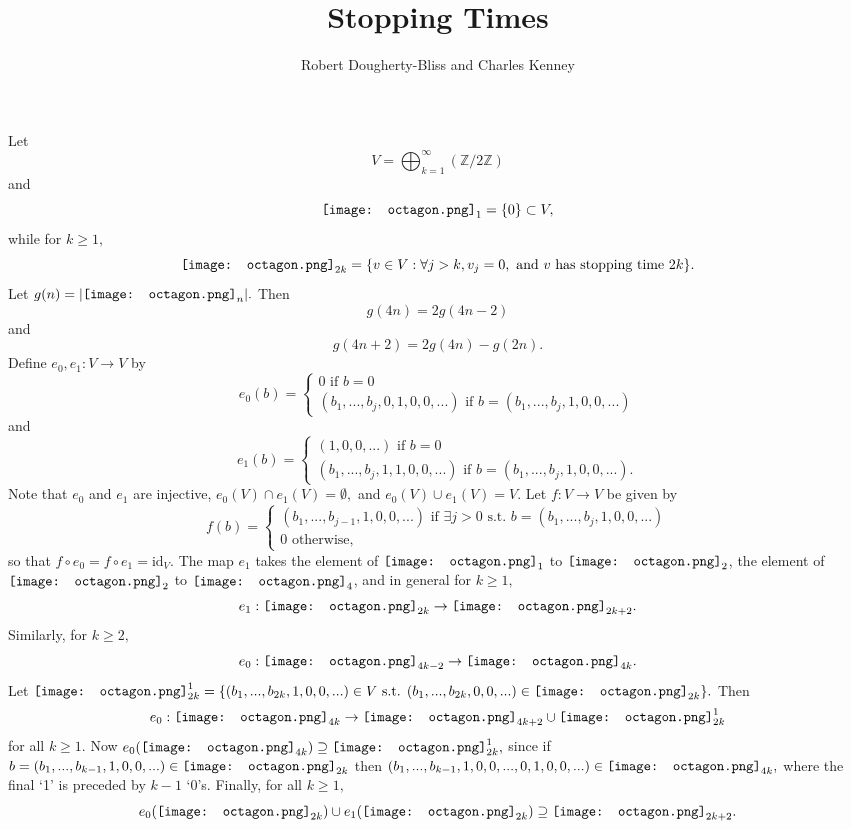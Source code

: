 \documentclass{amsart}
\title{Stopping Times}
\author{Robert Dougherty-Bliss and Charles Kenney}
\newcommand*\oct{\vcenter{\hbox{\texttt{[image: octagon.png]}}}}
\newcommand{\Z}{\mathbb{Z}}
\begin{document}
\maketitle
Let $$V = \bigoplus_{k=1}^\infty (\Z/2\Z)$$
and
$$\oct_1 = \{0\} \subset V,$$
while for $k \geq 1,$
$$\oct_{2k} = \{v \in V : \forall j > k, v_j = 0, \text{ and } v \text{ has stopping time } 2k \}. $$
Let $g(n) = |\oct_n|.$ Then
$$g(4n) = 2g(4n-2)$$
and
$$g(4n+2) = 2g(4n)-g(2n).$$
Define $e_0, e_1 : V \to V$ by
$$e_0(b) = \begin{cases} 0 \text{ if } b=0 \\ (b_1, ..., b_j, 0, 1, 0,0,...) \text{ if } b = (b_1, ..., b_j, 1, 0, 0, ...) \end{cases} $$
and
$$e_1(b) = \begin{cases} (1, 0,0,...) \text{ if } b=0 \\ (b_1, ..., b_j, 1, 1, 0,0,...) \text{ if } b=(b_1, ..., b_j, 1, 0, 0, ...). \end{cases} $$
Note that $e_0$ and $e_1$ are injective, $e_0(V) \cap e_1(V) = \emptyset,$ and $e_0(V) \cup e_1(V) = V.$
Let
$f:V \to V$
be given by
$$f(b) = \begin{cases} (b_1, ..., b_{j-1}, 1, 0,0,...) \text{ if } \exists j>0 \text{ s.t. } b = (b_1, ..., b_j, 1, 0,0,...) \\ 0 \text{ otherwise,} \end{cases}$$
so that $f \circ e_0 = f \circ e_1 = \text{id}_V.$
The map $e_1$ takes the element of $\oct_1$ to $\oct_2$, the element of $\oct_2$ to $\oct_4$, and in general for $k \geq 1,$
$$e_1 : \oct_{2k} \to \oct_{2k+2}.$$
Similarly, for $k \geq 2,$
$$e_0 : \oct_{4k-2} \to \oct_{4k}.$$
Let $\oct_{2k}^1 = \{(b_1, ..., b_{2k}, 1, 0,0,...) \in V \text{ s.t. } (b_1,...,b_{2k},0,0,...) \in \oct_{2k}\}.$
Then
$$e_0 : \oct_{4k} \to \oct_{4k+2} \cup \oct_{2k}^1$$
for all $k \geq 1.$
Now $e_0(\oct_{4k}) \supseteq \oct_{2k}^1,$ since if $b = (b_1, ..., b_{k-1}, 1, 0,0,...) \in \oct_{2k}$ then $(b_1, ..., b_{k-1}, 1, 0,0,...,0,1,0,0,...) \in \oct_{4k},$
where the final `1' is preceded by $k-1$ `0's.  
Finally, for all $k \geq 1,$
$$ e_0(\oct_{2k}) \cup e_1(\oct_{2k}) \supseteq \oct_{2k+2}.$$
\end{document}
